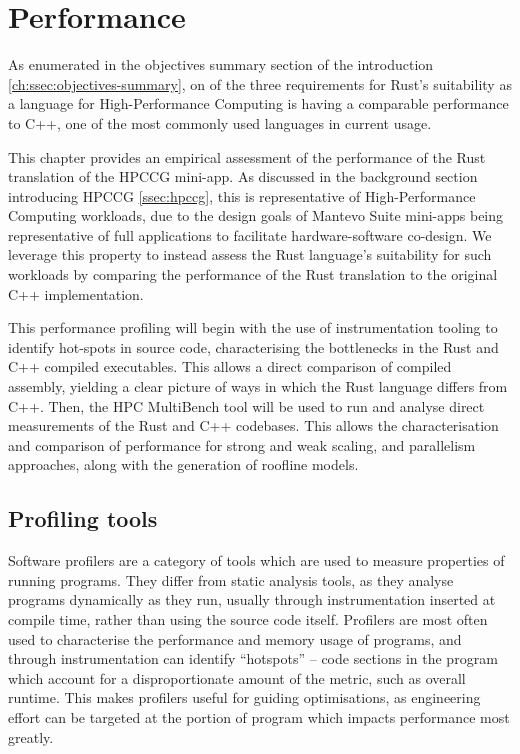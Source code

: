 \chapter{Performance}
\label{ch:performance} %

As enumerated in the objectives summary section of the introduction \ref{ch:ssec:objectives-summary}, on of the three requirements for Rust's suitability as a language for High-Performance Computing is having a comparable performance to C++, one of the most commonly used languages in current usage.

This chapter provides an empirical assessment of the performance of the Rust translation of the HPCCG mini-app. As discussed in the background section introducing HPCCG \ref{ssec:hpccg}, this is representative of High-Performance Computing workloads, due to the design goals of Mantevo Suite mini-apps being representative of full applications to facilitate hardware-software co-design. We leverage this property to instead assess the Rust language's suitability for such workloads by comparing the performance of the Rust translation to the original C++ implementation.

This performance profiling will begin with the use of instrumentation tooling to identify hot-spots in source code, characterising the bottlenecks in the Rust and C++ compiled executables. This allows a direct comparison of compiled assembly, yielding a clear picture of ways in which the Rust language differs from C++. Then, the HPC MultiBench tool will be used to run and analyse direct measurements of the Rust and C++ codebases. This allows the characterisation and comparison of performance for strong and weak scaling, and parallelism approaches, along with the generation of roofline models.

\section{Profiling tools}
\label{sec:profiling-tools} %

Software profilers are a category of tools which are used to measure properties of running programs. They differ from static analysis tools, as they analyse programs dynamically as they run, usually through instrumentation inserted at compile time, rather than using the source code itself. Profilers are most often used to characterise the performance and memory usage of programs, and through instrumentation can identify ``hotspots'' -- code sections in the program which account for a disproportionate amount of the metric, such as overall runtime. This makes profilers useful for guiding optimisations, as engineering effort can be targeted at the portion of program which impacts performance most greatly.

